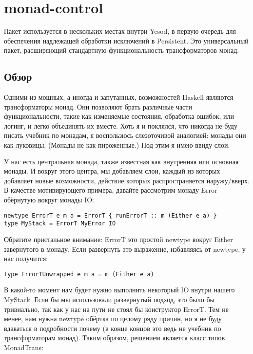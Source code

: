 \chapter{monad-control}\label{chap:monad-control}
Пакет
используется в нескольких местах внутри Yesod, в первую очередь для обеспечения
надлежащей обработки исключений в Persistent. Это универсальный пакет,
расширяющий стандартную функциональность трансформаторов монад.

\section{Обзор}
Одними из мощных, а иногда и запутанных, возможностей Haskell являются
трансформаторы монад. Они позволяют брать различные части функциональности,
такие как изменяемые состояния, обработка ошибок, или логинг, и легко
объединять их вместе. Хоть я и поклялся, что никогда не буду писать учебник по
монадам, я воспользюсь слезоточивой аналогией: монады они как луковицы. (Монады
не как пироженные.) Под этим я имею ввиду слои.

У нас есть центральная монада, также известная как внутренняя или основная
монады. И вокруг этого центра, мы добавляем слои, каждый из которых добавляет
новые возможности, действие которых распространяется наружу/вверх. В качестве
мотивирующего примера, давайте рассмотрим монаду Error обёрнутую вокруг монады
IO:

\begin{lstlisting}
newtype ErrorT e m a = ErrorT { runErrorT :: m (Either e a) }
type MyStack = ErrorT MyError IO
\end{lstlisting}

Обратите пристальное внимание: ErrorT это простой newtype вокруг Either
завернутого в монаду. Если развернуть это выражение, избавляясь от newtype, у
нас получится:

\begin{lstlisting}
type ErrorTUnwrapped e m a = m (Either e a)
\end{lstlisting}

В какой-то момент нам будет нужно выполнить некоторый IO внутри нашего MyStack.
Если бы мы использовали развернутый подход, это было бы тривиально, так как у
нас на пути не стоял бы конструктор ErrorT. Тем не менее, нам нужна newtype
обёртка по целому ряду причин, но я не буду вдаваться в подробности почему (в
конце концов это ведь не учебник по трансформаторам монад). Таким образом,
решением является класс типов MonadTrans:

